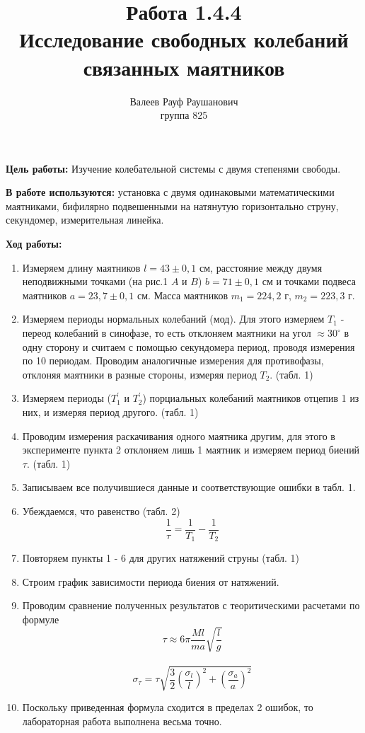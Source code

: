 \documentclass[a4paper, 12pt]{article}%
\author{Валеев Рауф Раушанович \\
группа 825}
\title{Работа 1.4.4 \\
Исследование свободных колебаний связанных маятников}
\begin{document}
\maketitle
\newpage
\textbf{Цель работы:} Изучение колебательной системы с двумя степенями свободы.

\textbf{В работе используются:} установка с двумя одинаковыми математическими маятниками, бифилярно подвешенными на натянутую горизонтально струну, секундомер, измерительная линейка. 

\textbf{Ход работы:}
\begin{enumerate}
\item Измеряем длину маятников $l = 43\pm 0,1$ см, расстояние между двумя неподвижными точками (на рис.1 $A$ и $B$) $b = 71\pm 0,1$ см и точками подвеса маятников $a = 23,7\pm 0,1$ см. Масса маятников $m_1 = 224,2$ г, $m_2 = 223,3$ г.
\begin{figure} [h]
\end{figure}
\item Измеряем периоды нормальных колебаний (мод). Для этого измеряем $T_1$ - переод колебаний в синофазе, то есть отклоняем маятники на угол $\approx 30^{ \circ}$ в одну сторону и считаем с помощью секундомера период, проводя измерения по 10 периодам. Проводим аналогичные измерения для противофазы, отклоняя маятники в разные стороны, измеряя период $T_2$. (табл. 1)
\item Измеряем периоды ($T_1^{'}$ и $T_2^{'}$) порциальных колебаний маятников отцепив 1 из них, и измеряя период другого. (табл. 1)
\item Проводим измерения раскачивания одного маятника другим, для этого в эксперименте пункта 2 отклоняем лишь 1 маятник и измеряем период биений $\tau$. (табл. 1)
\item Записываем все получившиеся данные и соответствующие ошибки в табл. 1.
\item Убеждаемся, что равенство (табл. 2)
\[\dfrac{1}{\tau} = \dfrac{1}{T_1} - \dfrac{1}{T_2}\]
\item Повторяем пункты 1 - 6 для других натяжений струны (табл. 1)
\item Строим график зависимости периода биения от натяжений.
\begin{figure} [h]
\end{figure}
\item Проводим сравнение полученных результатов с теоритическими расчетами по формуле 
\[ \tau \approx 6 \pi \dfrac{Ml}{ma} \sqrt{\dfrac{l}{g}} \] \\
\[ \sigma_{ \tau } = \tau \sqrt{\dfrac{3}{2} \left( \dfrac{\sigma_l}{l} \right) ^2 + \left( \dfrac{\sigma_a}{a} \right) ^2 } \]
\item Поскольку приведенная формула сходится в пределах 2 ошибок, то лабораторная работа выполнена весьма точно. 
\end{enumerate}
\end{document}
